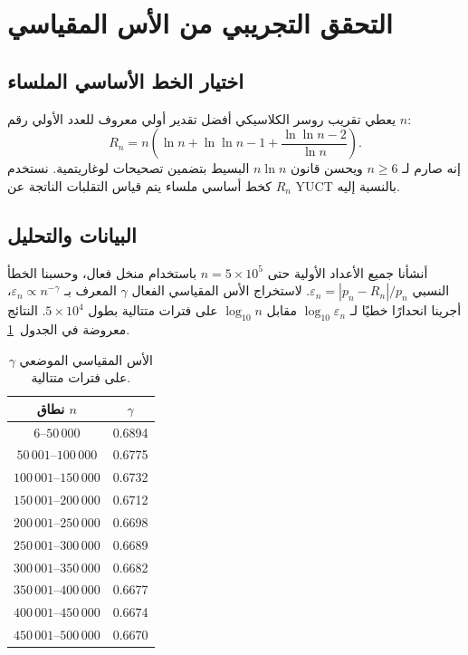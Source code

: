 \documentclass[11pt,a4paper]{article}
\begin{document}
	\section{التحقق التجريبي من الأس المقياسي}
	\subsection{اختيار الخط الأساسي الملساء}
	يعطي تقريب روسر الكلاسيكي \cite{Rosser1941} أفضل تقدير أولي معروف للعدد الأولي رقم $n$:
	\begin{equation}\label{eq:rosser}
		R_n = n\!\left(\ln n + \ln\ln n - 1 + \frac{\ln\ln n - 2}{\ln n}\right).
	\end{equation}
	إنه صارم لـ $n \ge 6$ ويحسن قانون $n\ln n$ البسيط بتضمين تصحيحات لوغاريتمية. نستخدم $R_n$ كخط أساسي ملساء يتم قياس التقلبات الناتجة عن YUCT بالنسبة إليه.
	
	\subsection{البيانات والتحليل}
	أنشأنا جميع الأعداد الأولية حتى $n = 5\times10^5$ باستخدام منخل فعال، وحسبنا الخطأ النسبي $\varepsilon_n = |p_n - R_n|/p_n$. لاستخراج الأس المقياسي الفعال $\gamma$ المعرف بـ $\varepsilon_n \propto n^{-\gamma}$، أجرينا انحدارًا خطيًا لـ $\log_{10}\varepsilon_n$ مقابل $\log_{10}n$ على فترات متتالية بطول $5\times10^4$. النتائج معروضة في الجدول~\ref{tab:gamma}.
	
	\begin{table}[htbp]
		\centering
		\caption{الأس المقياسي الموضعي $\gamma$ على فترات متتالية.}
		\label{tab:gamma}
		\small
		\begin{tabular}{c c}
			\toprule
			نطاق $n$ & $\gamma$ \\
			\midrule
			$6$--$50\,000$    & 0.6894 \\
			$50\,001$--$100\,000$ & 0.6775 \\
			$100\,001$--$150\,000$& 0.6732 \\
			$150\,001$--$200\,000$& 0.6712 \\
			$200\,001$--$250\,000$& 0.6698 \\
			$250\,001$--$300\,000$& 0.6689 \\
			$300\,001$--$350\,000$& 0.6682 \\
			$350\,001$--$400\,000$& 0.6677 \\
			$400\,001$--$450\,000$& 0.6674 \\
			$450\,001$--$500\,000$& 0.6670 \\
			\bottomrule
		\end{tabular}
	\end{table}
	
\end{document}
